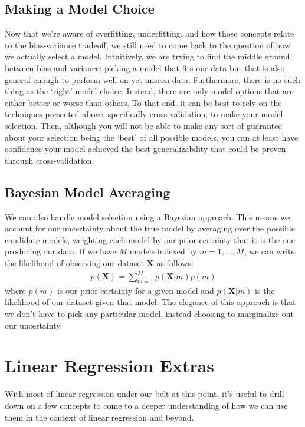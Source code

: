 \subsection{Making a Model Choice}
Now that we're aware of overfitting, underfitting, and how those concepts relate to the bias-variance tradeoff, we still need to come back to the question of how we actually select a model. Intuitively, we are trying to find the middle ground between bias and variance: picking a model that fits our data but that is also general enough to perform well on yet unseen data. Furthermore, there is no such thing as the `right' model choice. Instead, there are only model options that are either better or worse than others. To that end, it can be best to rely on the techniques presented above, specifically cross-validation, to make your model selection. Then, although you will not be able to make any sort of guarantee about your selection being the `best' of all possible models, you can at least have confidence your model achieved the best generalizability that could be proven through cross-validation.

\subsection{Bayesian Model Averaging}
We can also handle model selection using a Bayesian approach. This means we account for our uncertainty about the true model by averaging over the possible candidate models, weighting each model by our prior certainty that it is the one producing our data. If we have $M$ models indexed by $m = 1, ..., M$, we can write the likelihood of observing our dataset $\bm{X}$ as follows:
\begin{align*}
    p(\bm{X}) = \sum_{m=1}^{M} p(\bm{X}|m)p(m)
\end{align*}
where $p(m)$ is our prior certainty for a given model and $p(\bm{X}|m)$ is the likelihood of our dataset given that model. The elegance of this approach is that we don't have to pick any particular model, instead choosing to marginalize out our uncertainty.

\section{Linear Regression Extras}
With most of linear regression under our belt at this point, it's useful to drill down on a few concepts to come to a deeper understanding of how we can use them in the context of linear regression and beyond.

